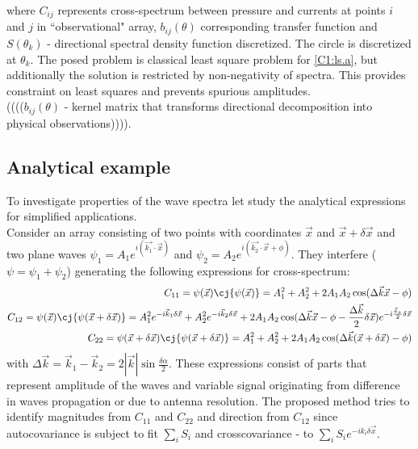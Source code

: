 where $C_{ij}$ represents cross-spectrum between pressure and currents at points $i$ and $j$ in ``observational" array, $b_{ij}(\theta)$ corresponding transfer function and $S(\theta_k)$ - directional spectral density function discretized. The circle is discretized at $\theta_k$. The posed problem is classical least square problem for \eqref{C1:ls.a}, but additionally the solution is restricted by non-negativity of spectra. This provides constraint on least squares and prevents spurious amplitudes.\\
\small{(((($b_{ij}(\theta)$ - kernel matrix that transforms directional decomposition into physical observations)))).}\\

\subsection{Analytical example}
To investigate properties of the wave spectra let study the analytical expressions for simplified applications.\\
Consider an array consisting of two points with coordinates $\vec{x}$ and $\vec{x} + \delta \vec{x}$ and two plane waves $\psi_1 = A_1 e^{i (\vec{k_1} \cdot \vec{x})}$ and $\psi_2 = A_2 e^{i (\vec{k_2} \cdot \vec{x} + \phi)}$. They interfere ($\psi = \psi_1 + \psi_2$) generating the following expressions for cross-spectrum:
\begin{subequations}
\begin{align}
C_{11} = \psi (\vec{x}) \cj{\psi(\vec{x})} = A_1^2 + A_2^2 + 2A_1A_2 \cos(\Delta \vec{k} \vec{x} - \phi) \label{C1:examp.a}\\
C_{12} = \psi (\vec{x}) \cj{\psi(\vec{x} + \delta \vec{x})} = 
 A_1^2 e^{-i \vec{k}_1 \delta \vec{x}} + A_2^2 e^{-i \vec{k}_2 \delta \vec{x}} + 2 A_1 A_2 \cos(\Delta \vec{k} \vec{x} - \phi - \frac{\Delta \vec{k}}{2} \delta \vec{x}) e^{-i \frac{\vec{k}_s}{2} \delta \vec{x}} \label{C1:examp.b}\\
C_{22} =  \psi (\vec{x} + \delta \vec{x}) \cj{\psi(\vec{x} + \delta \vec{x})} = 
A_1^2 + A_2^2 + 2A_1A_2 \cos(\Delta \vec{k} (\vec{x} + \delta \vec{x}) - \phi) \label{C1:examp.c}
\end{align}
\end{subequations}
with $\Delta \vec{k} = \vec{k}_1 - \vec{k}_2 = 2|\vec{k}| \sin \frac{\delta \alpha}{2}$. These expressions consist of parts that represent amplitude of the waves and variable signal originating from difference in waves propagation or due to antenna resolution. The proposed method tries to identify magnitudes from $C_{11}$ and $C_{22}$ and direction from $C_{12}$ since autocovariance is subject to fit $\sum_i S_i$ and crosscovariance - to $\sum_i S_i e^{-i k_i \delta \vec{x}}$.\\
